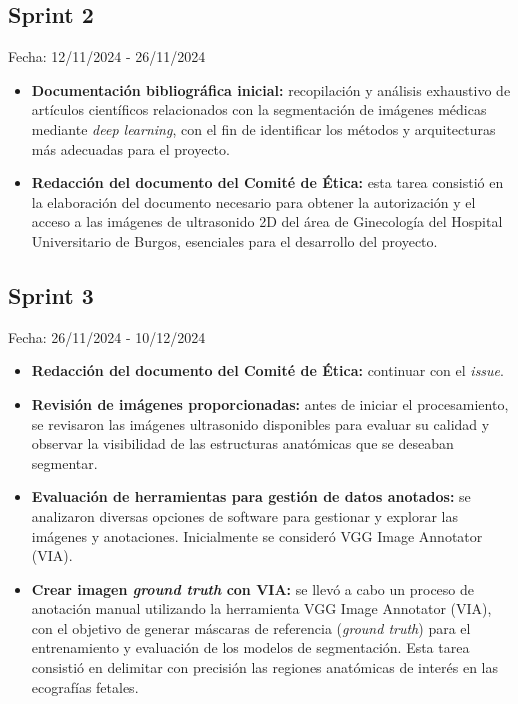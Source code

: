 \subsection{Sprint 2}
Fecha: 12/11/2024 - 26/11/2024
\begin{itemize}
    \item \textbf{Documentación bibliográfica inicial:} recopilación y análisis exhaustivo de artículos científicos relacionados con la segmentación de imágenes médicas mediante \textit{deep learning}, con el fin de identificar los métodos y arquitecturas más adecuadas para el proyecto.
    \item \textbf{Redacción del documento del Comité de Ética:} esta tarea consistió en la elaboración del documento necesario para obtener la autorización y el acceso a las imágenes de ultrasonido 2D del área de Ginecología del Hospital Universitario de Burgos, esenciales para el desarrollo del proyecto. 
\end{itemize}

\subsection{Sprint 3}
Fecha: 26/11/2024 - 10/12/2024
\begin{itemize}
    \item \textbf{Redacción del documento del Comité de Ética:} continuar con el \textit{issue}. 
    \item \textbf{Revisión de imágenes proporcionadas:} antes de iniciar el procesamiento, se revisaron las imágenes ultrasonido disponibles para evaluar su calidad y observar la visibilidad de las estructuras anatómicas que se deseaban segmentar.
    \item \textbf{Evaluación de herramientas para gestión de datos anotados:} se analizaron diversas opciones de software para gestionar y explorar las imágenes y anotaciones. Inicialmente se consideró VGG Image Annotator (VIA).
    \item \textbf{Crear imagen \textit{ground truth} con VIA:} se llevó a cabo un proceso de anotación manual utilizando la herramienta VGG Image Annotator (VIA), con el objetivo de generar máscaras de referencia (\textit{ground truth}) para el entrenamiento y evaluación de los modelos de segmentación. Esta tarea consistió en delimitar con precisión las regiones anatómicas de interés en las ecografías fetales.
\end{itemize}

